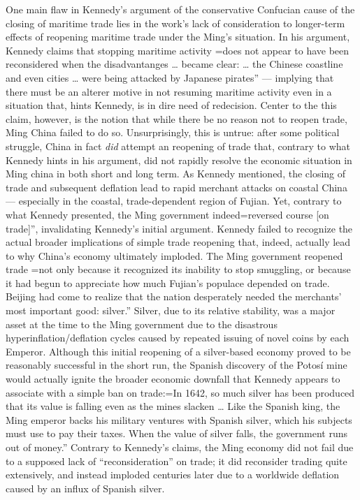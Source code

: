 \documentclass[letterpaper]{article}
\begin{document}
One main flaw in Kennedy's argument of the conservative Confucian cause
of the closing of maritime trade lies in the work's lack of
consideration to longer-term effects of reopening maritime trade under
the Ming's situation. In his argument, Kennedy claims that stopping
maritime activity
=does not appear to have been reconsidered when the disadvantanges \ldots{} became clear: \ldots{} the Chinese coastline and even cities \ldots{} were being attacked by Japanese pirates'' --- implying that there must be an alterer motive in not resuming maritime activity even in a situation that, hints Kennedy, is in dire need of redecision. Center to the this claim, however, is the notion that while there be no reason not to reopen trade, Ming China failed to do so. Unsurprisingly, this is untrue: after some political struggle, China in fact \textit{did} attempt an reopening of trade that, contrary to what Kennedy hints in his argument, did not rapidly resolve the economic situation in Ming china in both short and long term. As Kennedy mentioned, the closing of trade and subsequent deflation lead to rapid merchant attacks on coastal China --- especially in the coastal, trade-dependent region of Fujian. Yet, contrary to what Kennedy presented, the Ming government indeed=reversed
course [on trade]'', invalidating Kennedy's initial argument. Kennedy
failed to recognize the actual broader implications of simple trade
reopening that, indeed, actually lead to why China's economy ultimately
imploded. The Ming government reopened trade
=not only because it recognized its inability to stop smuggling, or because it had begun to appreciate how much Fujian's populace depended on trade. Beijing had come to realize that the nation desperately needed the merchants' most important good: silver.'' Silver, due to its relative stability, was a major asset at the time to the Ming government due to the disastrous hyperinflation/deflation cycles caused by repeated issuing of novel coins by each Emperor. Although this initial reopening of a silver-based economy proved to be reasonably successful in the short run, the Spanish discovery of the Potosí mine would actually ignite the broader economic downfall that Kennedy appears to associate with a simple ban on trade:=In
1642, so much silver has been produced that its value is falling even as
the mines slacken \ldots{} Like the Spanish king, the Ming emperor backs his
military ventures with Spanish silver, which his subjects must use to
pay their taxes. When the value of silver falls, the government runs out
of money.'' Contrary to Kennedy's claims, the Ming economy did not fail
due to a supposed lack of ``reconsideration'' on trade; it did
reconsider trading quite extensively, and instead imploded centuries
later due to a worldwide deflation caused by an influx of Spanish
silver.
\end{document}
